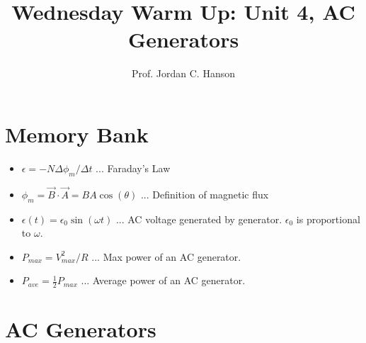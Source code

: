\documentclass{article}
\begin{document}
\twocolumn

\title{Wednesday Warm Up: Unit 4, AC Generators}
\author{Prof. Jordan C. Hanson}

\maketitle

\section{Memory Bank}

\begin{itemize}
\item $\epsilon = -N \Delta \phi_m /\Delta t$ ... Faraday's Law
\item $\phi_m = \vec{B} \cdot \vec{A} = BA \cos(\theta)$ ... Definition of magnetic flux
\item $\epsilon(t) = \epsilon_0 \sin(\omega t)$ ... AC voltage generated by generator.  $\epsilon_0$ is proportional to $\omega$.
\item $P_{max} = V_{max}^2/R$ ... Max power of an AC generator.
\item $P_{ave} = \frac{1}{2} P_{max}$ ... Average power of an AC generator.
\end{itemize}

\section{AC Generators}
\end{document}
